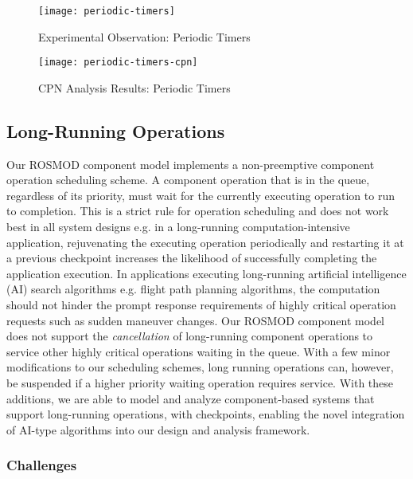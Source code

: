 \begin{figure}[h]
	\centering
	\texttt{[image: periodic-timers]}
	\caption{Experimental Observation: Periodic Timers}
	\label{fig:periodic-timers}
\end{figure}
\FloatBarrier

\begin{figure}[h]
	\centering
	\texttt{[image: periodic-timers-cpn]}
	\caption{CPN Analysis Results: Periodic Timers}
	\label{fig:periodic-timers-cpn}
\end{figure}
\FloatBarrier

\subsection{Long-Running Operations}
\label{sec:long_running_operations}

Our ROSMOD component model implements a non-preemptive component operation scheduling scheme. A component operation that is in the queue, regardless of its priority, must wait for the currently executing operation to run to completion. This is a strict rule for operation scheduling and does not work best in all system designs e.g. in a long-running computation-intensive application, rejuvenating the executing operation periodically and restarting it at a previous checkpoint increases the likelihood of successfully completing the application execution. In applications executing long-running artificial intelligence (AI) search algorithms e.g. flight path planning algorithms, the computation should not hinder the prompt response requirements of highly critical operation requests such as sudden maneuver changes. Our ROSMOD component model does not support the \emph{cancellation} of long-running component operations to service other highly critical operations waiting in the queue. With a few minor modifications to our scheduling schemes, long running operations can, however, be suspended if a higher priority waiting operation requires service. With these additions, we are able to model and analyze component-based systems that support long-running operations, with checkpoints, enabling the novel integration of AI-type algorithms into our design and analysis framework. 

\subsubsection{Challenges}

